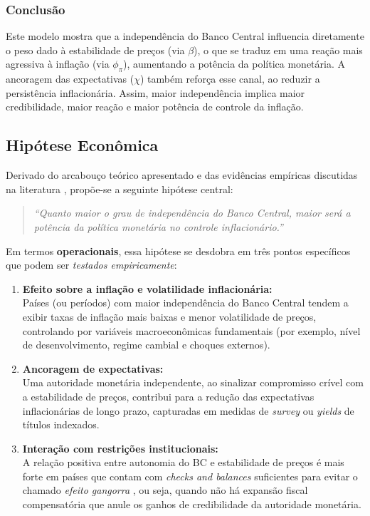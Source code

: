 \documentclass[a4paper,12pt]{article}[abnt2]
\begin{document}
\subsubsection{\textbf{Conclusão}}
Este modelo mostra que a independência do Banco Central influencia diretamente o peso dado à estabilidade de preços (via $\beta$), o que se traduz em uma reação mais agressiva à inflação (via $\phi_\pi$), aumentando a potência da política monetária. A ancoragem das expectativas ($\chi$) também reforça esse canal, ao reduzir a persistência inflacionária. Assim, maior independência implica maior credibilidade, maior reação e maior potência de controle da inflação.


\subsection{\textbf{Hipótese Econômica}}

Derivado do arcabouço teórico apresentado e das evidências empíricas discutidas na literatura \cite{adrian2024, jacome2022, unsal2023, acemoglu2008, woodford2003, gali2015}, propõe-se a seguinte hipótese central:

\begin{quote}
\textit{``Quanto maior o grau de independência do Banco Central, maior será a potência da política monetária no controle inflacionário.''}
\end{quote}

Em termos \textbf{operacionais}, essa hipótese se desdobra em três pontos específicos que podem ser \emph{testados empiricamente}:

\begin{enumerate}
    \item \textbf{Efeito sobre a inflação e volatilidade inflacionária:} \\
    Países (ou períodos) com maior independência do Banco Central tendem a exibir taxas de inflação mais baixas e menor volatilidade de preços, controlando por variáveis macroeconômicas fundamentais (por exemplo, nível de desenvolvimento, regime cambial e choques externos).

    \item \textbf{Ancoragem de expectativas:} \\
    Uma autoridade monetária independente, ao sinalizar compromisso crível com a estabilidade de preços, contribui para a redução das expectativas inflacionárias de longo prazo, capturadas em medidas de \emph{survey} ou \emph{yields} de títulos indexados.

    \item \textbf{Interação com restrições institucionais:} \\
    A relação positiva entre autonomia do BC e estabilidade de preços é mais forte em países que contam com \emph{checks and balances} suficientes para evitar o chamado \emph{efeito gangorra} \cite{acemoglu2008}, ou seja, quando não há expansão fiscal compensatória que anule os ganhos de credibilidade da autoridade monetária.
\end{enumerate}
\end{document}
